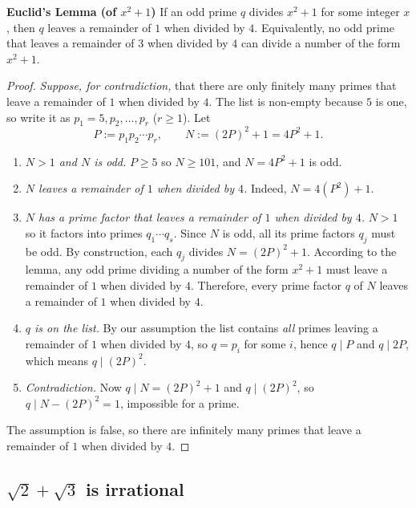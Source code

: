 \documentclass[11pt,a4paper]{article}
\theoremstyle{definition}
\begin{document}
\textbf{Euclid's Lemma (of $x^2+1$)} If an odd prime $q$ divides $x^2+1$ for some integer $x$, then $q$ leaves a remainder of $1$ when divided by $4$. Equivalently, no odd prime that leaves a remainder of $3$ when divided by $4$ can divide a number of the form $x^2+1$.

\begin{proof}
\emph{Suppose, for contradiction,} that there are only finitely many primes that leave a remainder of $1$ when divided by $4$. The list is non-empty because $5$ is one, so write it as $p_1=5,p_2,\dots,p_r$ ($r\ge1$). Let
\[
P:=p_1p_2\cdots p_r,\qquad N:=(2P)^2+1 = 4P^2+1 .
\]
\begin{enumerate}
  \item \emph{$N>1$ and $N$ is odd.} $P\ge5$ so $N\ge101$, and $N=4P^2+1$ is odd.
  \item \emph{$N$ leaves a remainder of $1$ when divided by $4$.} Indeed, $N=4(P^2)+1$.
  \item \emph{$N$ has a prime factor that leaves a remainder of $1$ when divided by $4$.} $N>1$ so it factors into primes $q_1\cdots q_s$. Since $N$ is odd, all its prime factors $q_j$ must be odd. By construction, each $q_j$ divides $N = (2P)^2+1$. According to the lemma, any odd prime dividing a number of the form $x^2+1$ must leave a remainder of $1$ when divided by $4$. Therefore, every prime factor $q$ of $N$ leaves a remainder of $1$ when divided by $4$.
  \item \emph{$q$ is on the list.} By our assumption the list contains \emph{all} primes leaving a remainder of $1$ when divided by $4$, so $q=p_i$ for some $i$, hence $q\mid P$ and $q\mid 2P$, which means $q\mid (2P)^2$.
  \item \emph{Contradiction.} Now $q\mid N=(2P)^2+1$ and $q\mid(2P)^2$, so $q\mid N-(2P)^2=1$, impossible for a prime.
\end{enumerate}
The assumption is false, so there are infinitely many primes that leave a remainder of $1$ when divided by $4$. 
\end{proof}














\subsection{$\sqrt2+\sqrt3$ is irrational}
\end{document}

